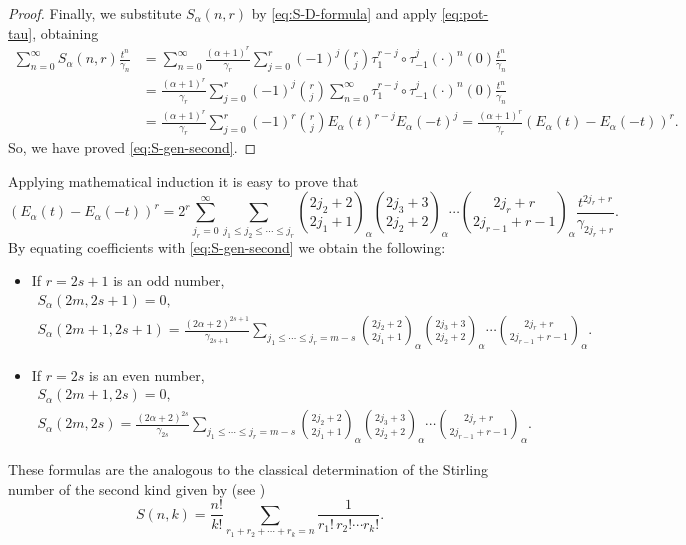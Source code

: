 \documentclass[11pt,a4paper]{article}
\theoremstyle{plain}
\theoremstyle{remark}
\newcommand{\Ea}{E_{\alpha}}
\newcommand{\binoma}[2]{\binom{#1}{#2}_{\!\alpha}}
\begin{document}
\begin{proof}
Finally, we substitute $S_{\alpha}(n,r)$ by \eqref{eq:S-D-formula} and apply \eqref{eq:pot-tau}, obtaining
\begin{align*}
  \sum_{n=0}^\infty S_{\alpha}(n,r) \frac{t^n}{\gamma_n}
  &= \sum_{n=0}^{\infty} \frac{(\alpha+1)^r}{\gamma_r}
  \sum_{j=0}^r (-1)^j \binom{r}{j}\tau_1^{r-j}\circ\tau_{-1}^j(\cdot)^n(0) \frac{t^n}{\gamma_n} \\
  &= \frac{(\alpha+1)^r}{\gamma_r} \sum_{j=0}^r (-1)^j\binom{r}{j}
  \sum_{n=0}^{\infty} \tau_1^{r-j}\circ\tau_{-1}^j(\cdot)^n(0) \frac{t^n}{\gamma_n} \\
  &= \frac{(\alpha+1)^r}{\gamma_r} \sum_{j=0}^r (-1)^r \binom{r}{j} \Ea(t)^{r-j}\Ea(-t)^j 
  = \frac{(\alpha+1)^r}{\gamma_r} (\Ea(t)-\Ea(-t))^r.
\end{align*}
So, we have proved \eqref{eq:S-gen-second}.
\end{proof}

Applying mathematical induction it is easy to prove that
\[
(\Ea(t)-\Ea(-t))^r
= 2^r\sum_{j_r=0}^{\infty} \sum_{j_1\le j_2 \le\cdots\le j_r}
\binoma{2j_2+2}{2j_1+1} \binoma{2j_3+3}{2j_2+2}\cdots \binoma{2j_r+r}{2j_{r-1}+r-1}
\frac{t^{2j_r+r}}{\gamma_{2j_r+r}}.
\]
By equating coefficients with \eqref{eq:S-gen-second} we obtain the following: 

\begin{itemize} 
\item If $r=2s+1$ is an odd number,
\begin{gather*}
  S_{\alpha}(2m,2s+1)=0,
\\
  S_{\alpha}(2m+1,2s+1) = \frac{(2\alpha+2)^{2s+1}}{\gamma_{2s+1}}
  \sum_{j_1\le\cdots \le j_r=m-s} \binoma{2j_2+2}{2j_1+1} \binoma{2j_3+3}{2j_2+2} \cdots 
  \binoma{2j_r+r}{2j_{r-1}+r-1}.
\end{gather*}
\item If $r=2s$ is an even number,
\begin{gather*}
  S_{\alpha}(2m+1,2s)=0,
\\
  S_{\alpha}(2m,2s) = \frac{(2\alpha+2)^{2s}}{\gamma_{2s}}
  \sum_{j_1\le\cdots \le j_r=m-s} \binoma{2j_2+2}{2j_1+1} \binoma{2j_3+3}{2j_2+2} \cdots 
  \binoma{2j_r+r}{2j_{r-1}+r-1}.
\end{gather*}
\end{itemize}
These formulas are the analogous to the classical determination of the Stirling number of the second kind given by (see \cite[\S\,60, (5), p.~176]{Jor2})
\[
  S(n,k) = \frac{n!}{k!} \sum_{r_1+r_2+\cdots+r_k=n} \frac{1}{r_1!\,r_2!\cdots r_k!}.
\]
\end{document}
